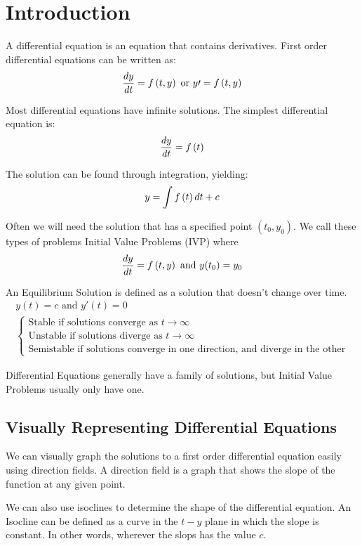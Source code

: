\section{Introduction}
A differential equation is an equation that contains derivatives. First order differential equations can be written as:
\[ \frac{dy}{dt} = f \left( t, y \right) \text{ or } y \prime = f \left( t, y \right) \]

Most differential equations have infinite solutions. The simplest differential equation is:
\[ \frac{dy}{dt} = f \left( t \right) \]

The solution can be found through integration, yielding:
\[ y = \int f \left( t \right) dt + c \]

Often we will need the solution that has a specified point $(t_0, y_0)$. We call these types of problems Initial Value Problems (IVP) where
\[ \frac{dy}{dt} = f \left( t, y \right) \text{ and } y(t_0)=y_0 \]

An Equilibrium Solution is defined as a solution that doesn't change over time.
\begin{equation}\label{eq:EquilibriumSolution}
    \begin{aligned}
    y(t) = c \text{ and } y\prime(t) = 0\\
        \begin{cases}
        \text{Stable if solutions converge as } t \to \infty \\
        \text{Unstable if solutions diverge as } t \to \infty \\
        \text{Semistable if solutions converge in one direction, and diverge in the other}
        \end{cases}
    \end{aligned}
\end{equation}

Differential Equations generally have a family of solutions, but Initial Value Problems usually only have one.

    \subsection{Visually Representing Differential Equations}\label{sec:visde}

    We can visually graph the solutions to a first order differential equation easily using direction fields. A direction field is a graph that shows the slope of the function at any given point.

    We can also use isoclines to determine the shape of the differential equation. An Isocline can be defined as a curve in the $t-y$ plane in which the slope is constant. In other words, wherever the slops has the value $c$.


